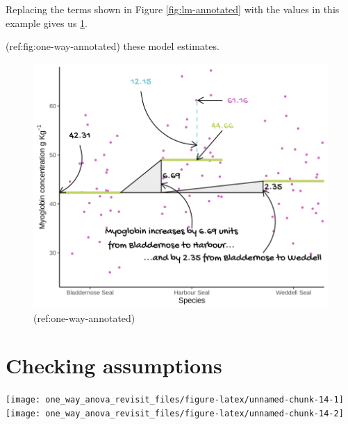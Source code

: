 \documentclass[
]{book}
\newenvironment{Shaded}{\begin{snugshade}}{\end{snugshade}}
\newcommand{\CommentTok}[1]{\textcolor[rgb]{0.56,0.35,0.01}{\textit{#1}}}
\newcommand{\DataTypeTok}[1]{\textcolor[rgb]{0.13,0.29,0.53}{#1}}
\newcommand{\DecValTok}[1]{\textcolor[rgb]{0.00,0.00,0.81}{#1}}
\newcommand{\KeywordTok}[1]{\textcolor[rgb]{0.13,0.29,0.53}{\textbf{#1}}}
\newcommand{\NormalTok}[1]{#1}
\newcommand{\OperatorTok}[1]{\textcolor[rgb]{0.81,0.36,0.00}{\textbf{#1}}}
\begin{document}
Replacing the terms shown in Figure \ref{fig:lm-annotated} with the values in this example gives us \ref{fig:one-way-annotated}.

(ref:fig:one-way-annotated) these model estimates.

\begin{figure}

\includegraphics[width=0.8\linewidth]{images/fig_7} \hfill{}

\caption{(ref:one-way-annotated)}\label{fig:one-way-annotated}
\end{figure}

\hypertarget{checking-assumptions-2}{%
\section{Checking assumptions}\label{checking-assumptions-2}}

\begin{Shaded}
\end{Shaded}

\begin{flushleft}\texttt{[image: one\_way\_anova\_revisit\_files/figure-latex/unnamed-chunk-14-1]} \texttt{[image: one\_way\_anova\_revisit\_files/figure-latex/unnamed-chunk-14-2]} \end{flushleft}
\end{document}
